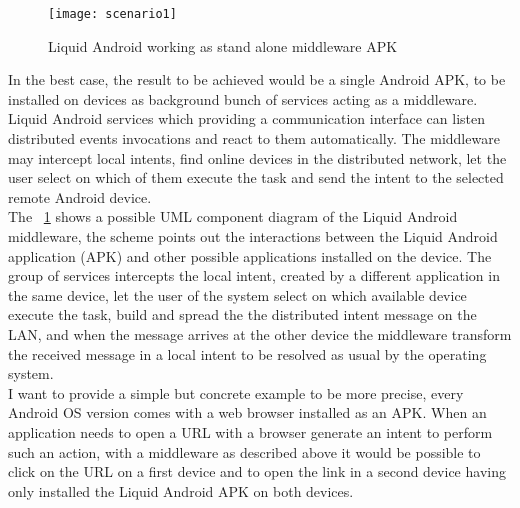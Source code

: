 \begin{figure}[h]
	\centering
	\texttt{[image: scenario1]}
	\caption{Liquid Android working as stand alone middleware APK}
	\label{fig:3.2}
\end{figure}
 

In the best case, the result to be achieved would be a single Android APK, to be installed on devices as background bunch of services acting as a middleware. Liquid Android services which providing a communication interface can listen distributed events invocations and react to them automatically. The middleware may intercept local intents, find online devices in the distributed network, let the user select on which of them execute the task and send the intent to the selected remote Android device.\\
The \figurename~\ref{fig:3.2} shows a possible UML component diagram of the Liquid Android middleware, the scheme points out the interactions between the Liquid Android application (APK) and other possible applications installed on the device. The group of services intercepts the local intent, created by a different application in the same device, let the user of the system select on which available device execute the task, build and spread the the distributed intent message on the LAN, and when the message arrives at the other device the middleware transform the received message in a local intent to be resolved as usual by the operating system.\\
I want to provide a simple but concrete example to be more precise, every Android OS version comes with a web browser installed as an APK. When an application needs to open a URL with a browser generate an intent to perform such an action, with a middleware as described above it would be possible to click on the URL on a first device and to open the link in a second device having only installed the Liquid Android APK on both devices.

